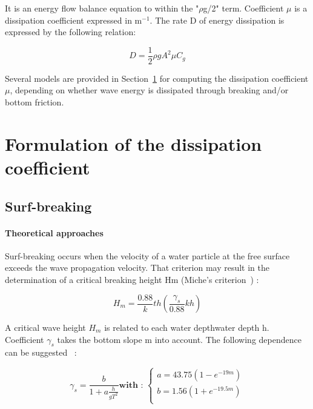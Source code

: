 It is an energy flow balance equation to within the "$\rho$g/2" term.
Coefficient $\mu$ is a dissipation coefficient expressed in m${}^{-1}$. The
rate D of energy dissipation is expressed by the following relation:

\begin{equation}
  D = \frac{1}{2}\rho g A^{2} \mu C_{g}
  \label{eq:3.36}
\end{equation}

Several models are provided in Section~\ref{dissipation_coeff} for computing the
dissipation coefficient $\mu$, depending on whether wave energy is dissipated
through breaking and/or bottom friction.


\section{Formulation of the dissipation coefficient}\label{dissipation_coeff}


\subsection{Surf-breaking }


\paragraph{Theoretical approaches }

Surf-breaking occurs when the velocity of a water particle at the free surface
exceeds the wave propagation velocity. That criterion may result in the
determination of a critical breaking height Hm  (Miche's criterion~\cite{Mei1983}) :

\begin{equation}
  H_{m} = \frac{0.88}{k}th\left(\frac{\gamma_{s}}{0.88}kh\right)
  \label{eq:3.37}
\end{equation}

A critical wave height $H_{m}$ is related to each water depthwater
depth h. Coefficient $\gamma_{s}$ takes the bottom slope m into account.
The following dependence can be suggested~\cite{Hamm1995} :

\begin{equation}
  \gamma_{s} = \frac{b}{1+a\frac{h}{gT^{2}}}
\textbf{with :   }
  \left\{\begin{matrix}
    a = 43.75(1-e^{-19m}) \\
    b = 1.56(1+e^{-19.5m}) \\
  \end{matrix}\right.
  \label{eq:3.38}
\end{equation}

